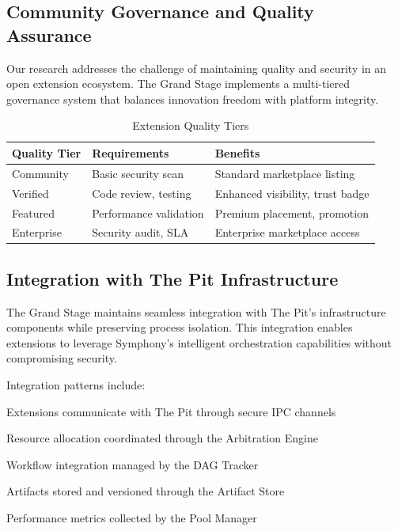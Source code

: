 \subsection*{Community Governance and Quality Assurance}

Our research addresses the challenge of maintaining quality and security in an open extension ecosystem. The Grand Stage implements a multi-tiered governance system that balances innovation freedom with platform integrity.

\begin{table}[ht]
\centering
\begin{tabular}{@{}lll@{}}
\toprule
\textbf{Quality Tier} & \textbf{Requirements} & \textbf{Benefits} \\
\midrule
Community & Basic security scan & Standard marketplace listing \\
Verified & Code review, testing & Enhanced visibility, trust badge \\
Featured & Performance validation & Premium placement, promotion \\
Enterprise & Security audit, SLA & Enterprise marketplace access \\
\bottomrule
\end{tabular}
\caption{Extension Quality Tiers}
\end{table}

\subsection*{Integration with The Pit Infrastructure}

The Grand Stage maintains seamless integration with The Pit's infrastructure components while preserving process isolation. This integration enables extensions to leverage Symphony's intelligent orchestration capabilities without compromising security.

Integration patterns include:

\begin{compactlist}
    \item Extensions communicate with The Pit through secure IPC channels
    \item Resource allocation coordinated through the Arbitration Engine
    \item Workflow integration managed by the DAG Tracker
    \item Artifacts stored and versioned through the Artifact Store
    \item Performance metrics collected by the Pool Manager
\end{compactlist}

